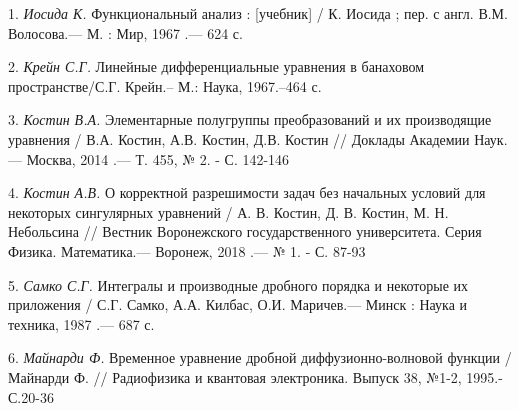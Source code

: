 \litlist

1. {\it Иосида К.} Функциональный анализ : [учебник] / К. Иосида ; пер. с англ. В.М. Волосова.— М. : Мир, 1967 .— 624 с.

2. {\it Крейн С.Г.} Линейные дифференциальные уравнения в банаховом
пространстве/С.Г. Крейн.-- М.: Наука, 1967.--464 с.

3. {\it Костин В.А.} Элементарные полугруппы преобразований и их производящие уравнения / В.А. Костин, А.В. Костин, Д.В. Костин // Доклады Академии Наук.— Москва, 2014 .— Т. 455, № 2. - С. 142-146

4. {\it Костин А.В.} О корректной разрешимости задач без начальных условий для некоторых сингулярных уравнений / А. В. Костин, Д. В. Костин, М. Н. Небольсина // Вестник Воронежского государственного университета. Серия Физика. Математика.— Воронеж, 2018 .— № 1. - С. 87-93

5. {\it Самко С.Г.} Интегралы и производные дробного порядка и некоторые их приложения / С.Г. Самко, А.А. Килбас, О.И. Маричев.— Минск : Наука и техника, 1987 .— 687 с.

6. {\it Майнарди Ф.} Временное уравнение дробной диффузионно-волновой функции /Майнарди Ф. // Радиофизика и квантовая электроника. Выпуск 38, №1-2, 1995.-С.20-36
